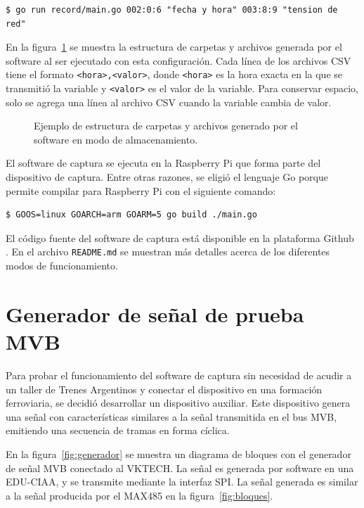 \begin{lstlisting}
$ go run record/main.go 002:0:6 "fecha y hora" 003:8:9 "tension de red"
\end{lstlisting}

En la figura~\ref{fig:carpetas} se muestra la estructura de carpetas y archivos generada por el software al ser ejecutado con esta configuración.
Cada línea de los archivos CSV tiene el formato \texttt{<hora>,\allowbreak <valor>}, donde \texttt{<hora>} es la hora exacta en la que se transmitió la variable y \texttt{<valor>} es el valor de la variable.
Para conservar espacio, solo se agrega una línea al archivo CSV cuando la variable cambia de valor.

\begin{figure}[htbp]
	\centering
    {
        \ttfamily
        \fontsize{8pt}{8pt}\selectfont
        
    }
	\caption{Ejemplo de estructura de carpetas y archivos generado por el software en modo de almacenamiento.}
    \label{fig:carpetas}
\end{figure}

El software de captura se ejecuta en la Raspberry Pi que forma parte del dispositivo de captura.
Entre otras razones, se eligió el lenguaje Go porque permite compilar para Raspberry Pi con el siguiente comando:

\begin{lstlisting}
$ GOOS=linux GOARCH=arm GOARM=5 go build ./main.go
\end{lstlisting}

El código fuente del software de captura está disponible en la plataforma Github \cite{mvbparse-go}.
En el archivo \texttt{README.md} se muestran más detalles acerca de los diferentes modos de funcionamiento.

\section{Generador de señal de prueba MVB}
\label{sec:generador}

Para probar el funcionamiento del software de captura sin necesidad de acudir a un taller de Trenes Argentinos y conectar el dispositivo en una formación ferroviaria, se decidió desarrollar un dispositivo auxiliar. Este dispositivo genera una señal con características similares a la señal transmitida en el bus MVB, emitiendo una secuencia de tramas en forma cíclica.

En la figura~\ref{fig:generador} se muestra un diagrama de bloques con el generador de señal MVB conectado al VKTECH. La señal es generada por software en una EDU-CIAA, y se transmite mediante la interfaz SPI. La señal generada es similar a la señal producida por el MAX485 en la figura~\ref{fig:bloques}.

